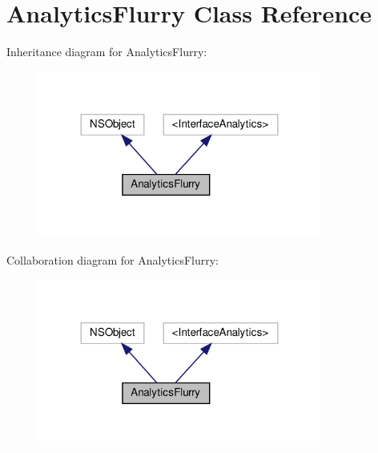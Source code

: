 \hypertarget{interfaceAnalyticsFlurry}{}\section{Analytics\+Flurry Class Reference}
\label{interfaceAnalyticsFlurry}


Inheritance diagram for Analytics\+Flurry\+:
\nopagebreak
\begin{figure}[H]
\begin{center}
\leavevmode
\includegraphics[width=264pt]{interfaceAnalyticsFlurry__inherit__graph}
\end{center}
\end{figure}


Collaboration diagram for Analytics\+Flurry\+:
\nopagebreak
\begin{figure}[H]
\begin{center}
\leavevmode
\includegraphics[width=264pt]{interfaceAnalyticsFlurry__coll__graph}
\end{center}
\end{figure}
